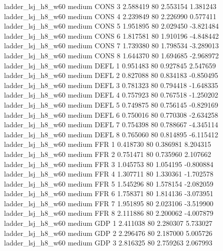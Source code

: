   ladder_lsj_h8_w60     medium     CONS                 3  2.588419 80       2.553154           1.381243
  ladder_lsj_h8_w60     medium     CONS                 4  2.239849 80       2.226990           0.577411
  ladder_lsj_h8_w60     medium     CONS                 5  1.951895 80       2.029450          -3.821484
  ladder_lsj_h8_w60     medium     CONS                 6  1.817581 80       1.910196          -4.848442
  ladder_lsj_h8_w60     medium     CONS                 7  1.739380 80       1.798534          -3.289013
  ladder_lsj_h8_w60     medium     CONS                 8  1.644370 80       1.694685          -2.968972
  ladder_lsj_h8_w60     medium     DEFL                 1  0.951483 80       0.927845           2.547659
  ladder_lsj_h8_w60     medium     DEFL                 2  0.827088 80       0.834183          -0.850495
  ladder_lsj_h8_w60     medium     DEFL                 3  0.781323 80       0.794418          -1.648335
  ladder_lsj_h8_w60     medium     DEFL                 4  0.757923 80       0.767518          -1.250202
  ladder_lsj_h8_w60     medium     DEFL                 5  0.749875 80       0.756145          -0.829169
  ladder_lsj_h8_w60     medium     DEFL                 6  0.750016 80       0.770308          -2.634258
  ladder_lsj_h8_w60     medium     DEFL                 7  0.754398 80       0.788667          -4.345114
  ladder_lsj_h8_w60     medium     DEFL                 8  0.765060 80       0.814895          -6.115412
  ladder_lsj_h8_w60     medium      FFR                 1  0.418730 80       0.386981           8.204315
  ladder_lsj_h8_w60     medium      FFR                 2  0.751471 80       0.735960           2.107662
  ladder_lsj_h8_w60     medium      FFR                 3  1.045753 80       1.054195          -0.800884
  ladder_lsj_h8_w60     medium      FFR                 4  1.307711 80       1.330361          -1.702578
  ladder_lsj_h8_w60     medium      FFR                 5  1.545296 80       1.578154          -2.082059
  ladder_lsj_h8_w60     medium      FFR                 6  1.758371 80       1.814136          -3.073951
  ladder_lsj_h8_w60     medium      FFR                 7  1.951895 80       2.023106          -3.519900
  ladder_lsj_h8_w60     medium      FFR                 8  2.111886 80       2.200062          -4.007879
  ladder_lsj_h8_w60     medium      GDP                 1  2.411038 80       2.280307           5.733027
  ladder_lsj_h8_w60     medium      GDP                 2  2.296476 80       2.187000           5.005726
  ladder_lsj_h8_w60     medium      GDP                 3  2.816325 80       2.759263           2.067993
